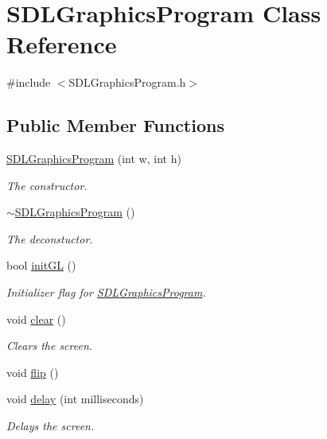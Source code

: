 \hypertarget{class_s_d_l_graphics_program}{}\section{S\+D\+L\+Graphics\+Program Class Reference}
\label{class_s_d_l_graphics_program}


{\ttfamily \#include $<$S\+D\+L\+Graphics\+Program.\+h$>$}

\subsection*{Public Member Functions}
\begin{DoxyCompactItemize}
\item 
\mbox{\hyperlink{class_s_d_l_graphics_program_a976683178e086cd2a1a801fd9c501a7b}{S\+D\+L\+Graphics\+Program}} (int w, int h)
\begin{DoxyCompactList}\small\item\em The constructor. \end{DoxyCompactList}\item 
\mbox{\hyperlink{class_s_d_l_graphics_program_a2504412e7eaa011a1116447eb4d5ec00}{$\sim$\+S\+D\+L\+Graphics\+Program}} ()
\begin{DoxyCompactList}\small\item\em The deconstuctor. \end{DoxyCompactList}\item 
bool \mbox{\hyperlink{class_s_d_l_graphics_program_a6cc65adc2dde4f2346839685c4e43ea9}{init\+GL}} ()
\begin{DoxyCompactList}\small\item\em Initializer flag for \mbox{\hyperlink{class_s_d_l_graphics_program}{S\+D\+L\+Graphics\+Program}}. \end{DoxyCompactList}\item 
void \mbox{\hyperlink{class_s_d_l_graphics_program_a56942edfd4c5f45334ba55adb2558d35}{clear}} ()
\begin{DoxyCompactList}\small\item\em Clears the screen. \end{DoxyCompactList}\item 
void \mbox{\hyperlink{class_s_d_l_graphics_program_a1b2040042b2fc4bda09f365d7885e9a3}{flip}} ()
\item 
void \mbox{\hyperlink{class_s_d_l_graphics_program_a299c62853b3f28fc3930880fc4c128ba}{delay}} (int milliseconds)
\begin{DoxyCompactList}\small\item\em Delays the screen. \end{DoxyCompactList}\item 

\end{DoxyCompactItemize}
